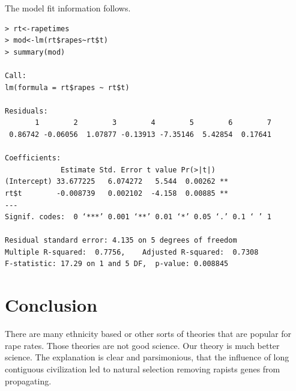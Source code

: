 \documentclass{amsart}
\begin{document}
The model fit information follows.

\begin{verbatim}
> rt<-rapetimes
> mod<-lm(rt$rapes~rt$t)
> summary(mod)

Call:
lm(formula = rt$rapes ~ rt$t)

Residuals:
       1        2        3        4        5        6        7 
 0.86742 -0.06056  1.07877 -0.13913 -7.35146  5.42854  0.17641 

Coefficients:
             Estimate Std. Error t value Pr(>|t|)   
(Intercept) 33.677225   6.074272   5.544  0.00262 **
rt$t        -0.008739   0.002102  -4.158  0.00885 **
---
Signif. codes:  0 ‘***’ 0.001 ‘**’ 0.01 ‘*’ 0.05 ‘.’ 0.1 ‘ ’ 1

Residual standard error: 4.135 on 5 degrees of freedom
Multiple R-squared:  0.7756,	Adjusted R-squared:  0.7308 
F-statistic: 17.29 on 1 and 5 DF,  p-value: 0.008845
\end{verbatim}

\section{Conclusion}
There are many ethnicity based or other sorts of theories that are popular for rape rates.  Those theories are not good science.  Our theory is much better science.  The explanation is clear and parsimonious, that the influence of long contiguous civilization led to natural selection removing rapists genes from propagating.  

\begin{thebibliography}{CCC}
\end{thebibliography}
\end{document}
